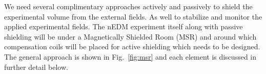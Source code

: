 We need several complimentary approaches actively and passively to shield the experimental volume from the external fields. As well to stabilize and monitor the applied experimental fields. The nEDM experiment itself along with passive shielding will be under a Magnetically Shielded Room (MSR) and around which compensation coils will be placed for active shielding which needs to be designed. The general approach is shown in Fig.~\ref{fig:msr} and each element is discussed in further detail below. 














